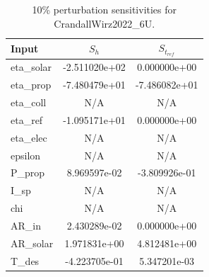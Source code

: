 \begin{table}[h]
    \centering
    \begin{tabular}{lcc}
        \toprule
        Input & $S_h$ & $S_{t_{ref}}$ \\
        \midrule
        eta\_solar & -2.511020e+02 & 0.000000e+00 \\
        eta\_prop & -7.480479e+01 & -7.486082e+01 \\
        eta\_coll & N/A & N/A \\
        eta\_ref & -1.095171e+01 & 0.000000e+00 \\
        eta\_elec & N/A & N/A \\
        epsilon & N/A & N/A \\
        P\_prop & 8.969597e-02 & -3.809926e-01 \\
        I\_sp & N/A & N/A \\
        chi & N/A & N/A \\
        AR\_in & 2.430289e-02 & 0.000000e+00 \\
        AR\_solar & 1.971831e+00 & 4.812481e+00 \\
        T\_des & -4.223705e-01 & 5.347201e-03 \\
        \bottomrule
    \end{tabular}
    \caption{10\% perturbation sensitivities for CrandallWirz2022\_6U.}
    \label{tab:sensitivity_crandallwirz2022_6u}
\end{table}

